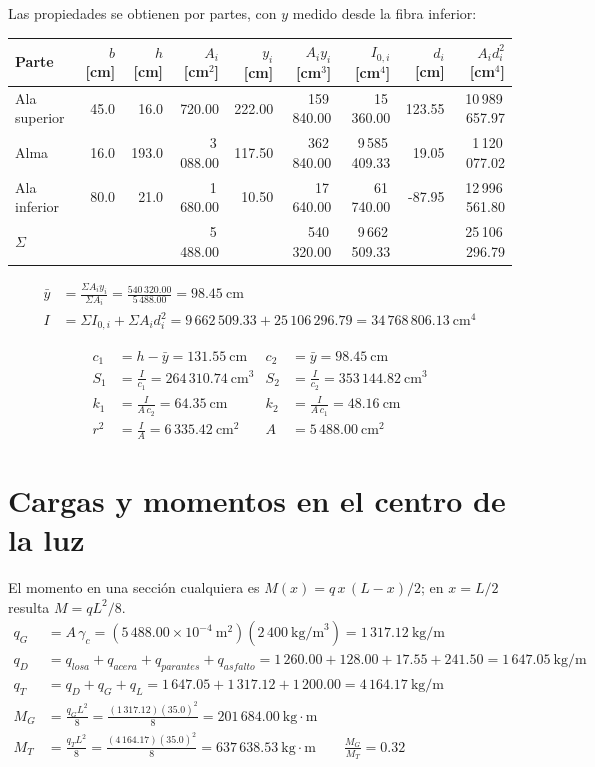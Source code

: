 \documentclass[11pt,a4paper]{article}
\begin{document}
Las propiedades se obtienen por partes, con $y$ medido desde la fibra inferior:
\begin{center}\footnotesize\setlength{\tabcolsep}{4pt}
\begin{tabular}{lrrrrrrrr}
\toprule
Parte & $b$ [cm] & $h$ [cm] & $A_i$ [cm$^2$] & $y_i$ [cm] & $A_i y_i$ [cm$^3$] & $I_{0,i}$ [cm$^4$] & $d_i$ [cm] & $A_i d_i^2$ [cm$^4$] \\
\midrule
Ala superior & 45.0 & 16.0 & 720.00 & 222.00 & 159\,840.00 & 15\,360.00 & 123.55 & 10\,989\,657.97 \\
Alma & 16.0 & 193.0 & 3\,088.00 & 117.50 & 362\,840.00 & 9\,585\,409.33 & 19.05 & 1\,120\,077.02 \\
Ala inferior & 80.0 & 21.0 & 1\,680.00 & 10.50 & 17\,640.00 & 61\,740.00 & -87.95 & 12\,996\,561.80 \\
\midrule
$\Sigma$ & & & 5\,488.00 & & 540\,320.00 & 9\,662\,509.33 & & 25\,106\,296.79 \\
\bottomrule
\end{tabular}
\end{center}
\begin{align*}
\bar y &= \frac{\Sigma A_i y_i}{\Sigma A_i} = \frac{540\,320.00}{5\,488.00} = 98.45\ \text{cm} \\
I &= \Sigma I_{0,i} + \Sigma A_i d_i^2 = 9\,662\,509.33 + 25\,106\,296.79 = 34\,768\,806.13\ \text{cm}^4
\end{align*}

\begin{align*}
c_1 &= h - \bar y = 131.55\ \text{cm} & c_2 &= \bar y = 98.45\ \text{cm}\\
S_1 &= \frac{I}{c_1} = 264\,310.74\ \text{cm}^3 & S_2 &= \frac{I}{c_2} = 353\,144.82\ \text{cm}^3\\
k_1 &= \frac{I}{A\,c_2} = 64.35\ \text{cm} & k_2 &= \frac{I}{A\,c_1} = 48.16\ \text{cm}\\
r^2 &= \frac{I}{A} = 6\,335.42\ \text{cm}^2 & A &= 5\,488.00\ \text{cm}^2
\end{align*}


\section{Cargas y momentos en el centro de la luz}
El momento en una sección cualquiera es $M(x) = q\,x\,(L-x)/2$; en $x = L/2$ resulta $M = q L^2/8$.
\begin{align*}
q_G &= A\,\gamma_c = (5\,488.00\times10^{-4}\ \text{m}^2)(2\,400\ \text{kg/m}^3) = 1\,317.12\ \text{kg/m}\\
q_D &= q_{losa} + q_{acera} + q_{parantes} + q_{asfalto} = 1\,260.00 + 128.00 + 17.55 + 241.50 = 1\,647.05\ \text{kg/m}\\
q_T &= q_D + q_G + q_L = 1\,647.05 + 1\,317.12 + 1\,200.00 = 4\,164.17\ \text{kg/m}\\
M_G &= \frac{q_G L^2}{8} = \frac{(1\,317.12)(35.0)^2}{8} = 201\,684.00\ \text{kg}\cdot\text{m}\\
M_T &= \frac{q_T L^2}{8} = \frac{(4\,164.17)(35.0)^2}{8} = 637\,638.53\ \text{kg}\cdot\text{m}
\qquad \frac{M_G}{M_T} = 0.32
\end{align*}
\end{document}

